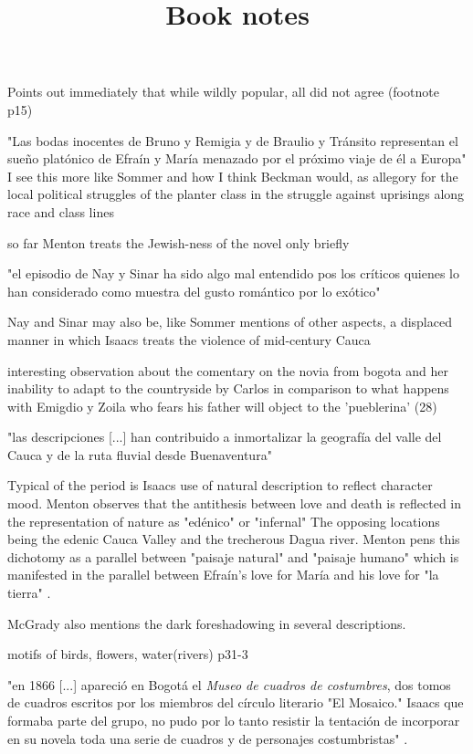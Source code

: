 \documentclass[12pt]{article}
\title{Book notes}
\makeatletter
\newcommand\iraggedright{%
	\let\\\@centercr\@rightskip\@flushglue \rightskip\@rightskip
	\leftskip\z@skip}
\makeatother
\begin{document}
	\makeheader
	\iraggedright

Points out immediately that while wildly popular, all did not agree (footnote p15)

"Las bodas inocentes de Bruno y Remigia y de Braulio y Tránsito representan el sueño platónico de Efraín y María menazado por el próximo viaje de él a Europa" \cite[24]{Menton1978}
I see this more like Sommer and how I think Beckman would, as allegory for the local political struggles of the planter class in the struggle against uprisings along race and class lines

so far Menton treats the Jewish-ness of the novel only briefly 

"el episodio de Nay y Sinar ha sido algo mal entendido pos los críticos quienes lo han considerado como muestra del gusto romántico por lo exótico" \cite[25]{Menton1978}

Nay and Sinar may also be, like Sommer mentions of other aspects, a displaced manner in which Isaacs treats the violence of mid-century Cauca

interesting observation about the comentary on the novia from bogota and her inability to adapt to the countryside by Carlos in comparison to what happens with Emigdio y Zoila who fears his father will object to the 'pueblerina' (28) 

"las descripciones [...] han contribuido a inmortalizar la geografía del valle del Cauca y de la ruta fluvial desde Buenaventura" \cite[29]{Menton1978}

Typical of the period is Isaacs use of natural description to reflect character mood. Menton observes that the antithesis between love and death is reflected in the representation of nature as "edénico" or "infernal" \cite[30]{Menton1978} The opposing locations being the edenic Cauca Valley and the trecherous Dagua river. Menton pens this dichotomy as a parallel between "paisaje natural" and "paisaje humano" which is manifested in the parallel between Efraín's love for María and his love for "la tierra" \cite[29]{Menton1978}.

McGrady also mentions the dark foreshadowing in several descriptions.

motifs of birds, flowers, water(rivers) p31-3

"en 1866 [...] apareció en Bogotá el \textit{Museo de cuadros de costumbres}, dos tomos de cuadros escritos por los miembros del círculo literario "El Mosaico." Isaacs que formaba parte del grupo, no pudo por lo tanto resistir la tentación de incorporar en su novela toda una serie de cuadros y de personajes costumbristas" \cite[34]{Menton1978}.
\end{document}
